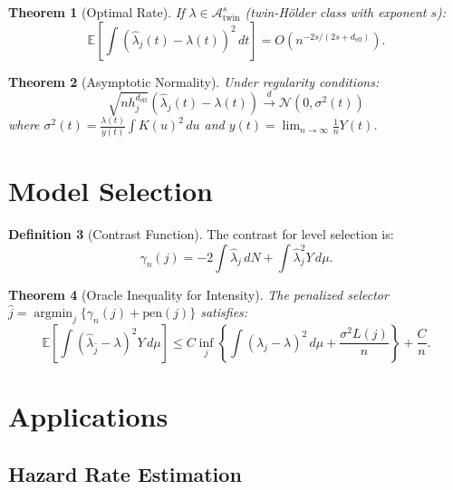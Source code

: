 \documentclass[11pt,twoside,openright]{book}
\theoremstyle{plain}
\newtheorem{theorem}{Theorem}[chapter]
\theoremstyle{definition}
\newtheorem{definition}[theorem]{Definition}
\theoremstyle{remark}
\newcommand{\calN}{\mathcal{N}}
\newcommand{\calA}{\mathcal{A}}
\newcommand{\E}{\mathbb{E}}
\newcommand{\deff}{d_{\mathrm{eff}}}
\DeclareMathOperator{\argmin}{argmin}
\begin{document}
\begin{theorem}[Optimal Rate]
\label{thm:intensity-rate}
If $\lambda \in \calA_{\text{twin}}^s$ (twin-Hölder class with exponent $s$):
\begin{equation}
\E\left[\int (\hat{\lambda}_j(t) - \lambda(t))^2 \, dt\right] = O(n^{-2s/(2s + \deff)}).
\label{eq:intensity-rate}
\end{equation}
\end{theorem}

\begin{theorem}[Asymptotic Normality]
\label{thm:intensity-clt}
Under regularity conditions:
\begin{equation}
\sqrt{nh_j^{\deff}}(\hat{\lambda}_j(t) - \lambda(t)) \xrightarrow{d} \calN(0, \sigma^2(t))
\label{eq:intensity-clt}
\end{equation}
where $\sigma^2(t) = \frac{\lambda(t)}{y(t)} \int K(u)^2 \, du$ and $y(t) = \lim_{n \to \infty} \frac{1}{n} Y(t)$.
\end{theorem}

\section{Model Selection}

\begin{definition}[Contrast Function]
The contrast for level selection is:
\begin{equation}
\gamma_n(j) = -2\int \hat{\lambda}_j \, dN + \int \hat{\lambda}_j^2 Y \, d\mu.
\label{eq:intensity-contrast}
\end{equation}
\end{definition}

\begin{theorem}[Oracle Inequality for Intensity]
\label{thm:intensity-oracle}
The penalized selector $\hat{j} = \argmin_j \{\gamma_n(j) + \text{pen}(j)\}$ satisfies:
\begin{equation}
\E\left[\int (\hat{\lambda}_{\hat{j}} - \lambda)^2 Y \, d\mu\right] \leq C \inf_j \left\{\int (\lambda_j - \lambda)^2 \, d\mu + \frac{\sigma^2 L(j)}{n}\right\} + \frac{C}{n}.
\label{eq:intensity-oracle}
\end{equation}
\end{theorem}

\section{Applications}

\subsection{Hazard Rate Estimation}
\end{document}

